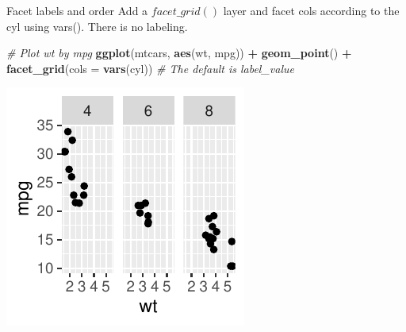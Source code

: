 \documentclass[
  ignorenonframetext,
]{beamer}
\newenvironment{Shaded}{\begin{snugshade}}{\end{snugshade}}
\newcommand{\AttributeTok}[1]{\textcolor[rgb]{0.13,0.29,0.53}{#1}}
\newcommand{\CommentTok}[1]{\textcolor[rgb]{0.56,0.35,0.01}{\textit{#1}}}
\newcommand{\FunctionTok}[1]{\textcolor[rgb]{0.13,0.29,0.53}{\textbf{#1}}}
\newcommand{\NormalTok}[1]{#1}
\newcommand{\SpecialCharTok}[1]{\textcolor[rgb]{0.81,0.36,0.00}{\textbf{#1}}}
\begin{document}
\begin{frame}[fragile]{Facet labels and order}
\label{facet-labels-and-order-3}
Add a \(facet\_grid()\) layer and facet cols according to the cyl using
vars(). There is no labeling.


\begin{Shaded}
\begin{Highlighting}[]
\CommentTok{\# Plot wt by mpg}
\FunctionTok{ggplot}\NormalTok{(mtcars, }\FunctionTok{aes}\NormalTok{(wt, mpg)) }\SpecialCharTok{+} \FunctionTok{geom\_point}\NormalTok{() }\SpecialCharTok{+} \FunctionTok{facet\_grid}\NormalTok{(}\AttributeTok{cols =} \FunctionTok{vars}\NormalTok{(cyl))  }\CommentTok{\# The default is label\_value}
\end{Highlighting}
\end{Shaded}

\begin{center}\includegraphics[width=0.5\linewidth]{Figs/unnamed-chunk-82-1} \end{center}
\end{frame}
\end{document}

